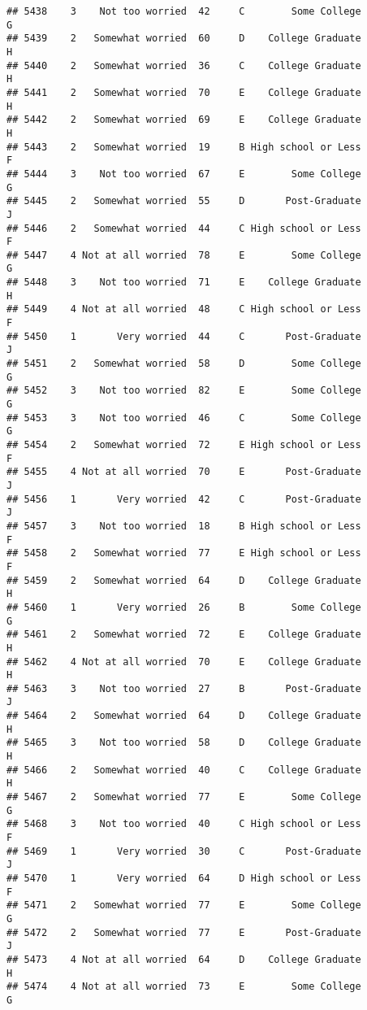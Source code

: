 \documentclass[
]{article}
\begin{document}
\begin{verbatim}
## 5438    3    Not too worried  42     C        Some College         G
## 5439    2   Somewhat worried  60     D    College Graduate         H
## 5440    2   Somewhat worried  36     C    College Graduate         H
## 5441    2   Somewhat worried  70     E    College Graduate         H
## 5442    2   Somewhat worried  69     E    College Graduate         H
## 5443    2   Somewhat worried  19     B High school or Less         F
## 5444    3    Not too worried  67     E        Some College         G
## 5445    2   Somewhat worried  55     D       Post-Graduate         J
## 5446    2   Somewhat worried  44     C High school or Less         F
## 5447    4 Not at all worried  78     E        Some College         G
## 5448    3    Not too worried  71     E    College Graduate         H
## 5449    4 Not at all worried  48     C High school or Less         F
## 5450    1       Very worried  44     C       Post-Graduate         J
## 5451    2   Somewhat worried  58     D        Some College         G
## 5452    3    Not too worried  82     E        Some College         G
## 5453    3    Not too worried  46     C        Some College         G
## 5454    2   Somewhat worried  72     E High school or Less         F
## 5455    4 Not at all worried  70     E       Post-Graduate         J
## 5456    1       Very worried  42     C       Post-Graduate         J
## 5457    3    Not too worried  18     B High school or Less         F
## 5458    2   Somewhat worried  77     E High school or Less         F
## 5459    2   Somewhat worried  64     D    College Graduate         H
## 5460    1       Very worried  26     B        Some College         G
## 5461    2   Somewhat worried  72     E    College Graduate         H
## 5462    4 Not at all worried  70     E    College Graduate         H
## 5463    3    Not too worried  27     B       Post-Graduate         J
## 5464    2   Somewhat worried  64     D    College Graduate         H
## 5465    3    Not too worried  58     D    College Graduate         H
## 5466    2   Somewhat worried  40     C    College Graduate         H
## 5467    2   Somewhat worried  77     E        Some College         G
## 5468    3    Not too worried  40     C High school or Less         F
## 5469    1       Very worried  30     C       Post-Graduate         J
## 5470    1       Very worried  64     D High school or Less         F
## 5471    2   Somewhat worried  77     E        Some College         G
## 5472    2   Somewhat worried  77     E       Post-Graduate         J
## 5473    4 Not at all worried  64     D    College Graduate         H
## 5474    4 Not at all worried  73     E        Some College         G

\end{verbatim}
\end{document}
